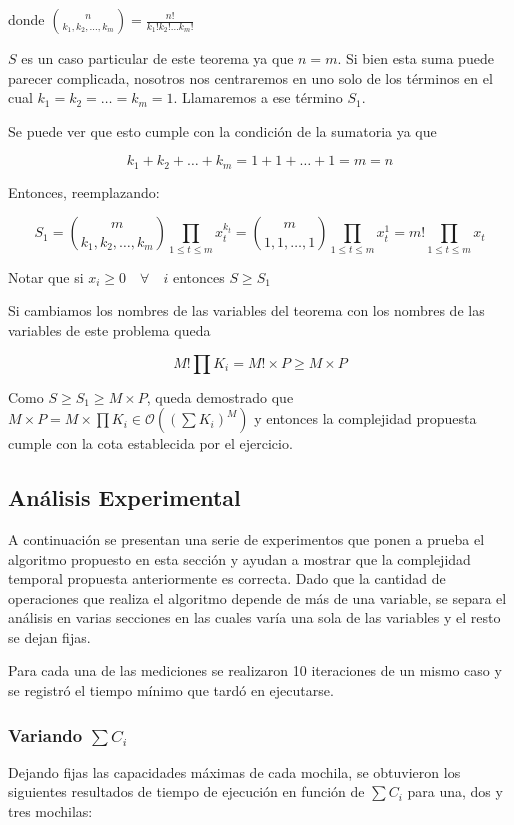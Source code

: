 donde $\binom{n}{k_1, k_2, \ldots , k_m} = \frac{n!}{k_1! k_2! \ldots k_m!}$

$S$ es un caso particular de este teorema ya que $n = m$. Si bien esta suma puede parecer complicada, nosotros nos centraremos en uno solo de los términos en el cual $k_1 = k_2 = \ldots = k_m = 1$. Llamaremos a ese término $S_1$.

Se puede ver que esto cumple con la condición de la sumatoria ya que

$$k_1 + k_2 + \ldots + k_m = 1 + 1 + \ldots + 1 = m = n$$

Entonces, reemplazando:

$$S_1 = \binom{m}{k_1, k_2, \ldots , k_m} \prod_{1 \leq t \leq m} x_t^{k_t} = \binom{m}{1, 1, \ldots , 1} \prod_{1 \leq t \leq m} x_t^{1} = m! \prod_{1 \leq t \leq m} x_t $$

Notar que si $x_i \geq 0 \quad \forall \quad i$ entonces $S \geq S_1$

Si cambiamos los nombres de las variables del teorema con los nombres de las variables de este problema queda

$$M! \prod K_i = M! \times P \geq M \times P$$

Como $S \geq S_1 \geq M \times P$, queda demostrado que $M \times P = M \times \prod K_i \in \mathcal{O}((\sum K_i)^M)$ y entonces la complejidad propuesta cumple con la cota establecida por el ejercicio.\QEDB

\subsection{Análisis Experimental}

A continuación se presentan una serie de experimentos que ponen a prueba el algoritmo propuesto en esta sección y ayudan a mostrar que la complejidad temporal propuesta anteriormente es correcta.
Dado que la cantidad de operaciones que realiza el algoritmo depende de más de una variable, se separa el análisis en varias secciones en las cuales varía una sola de las variables y el resto se dejan fijas.

Para cada una de las mediciones se realizaron 10 iteraciones de un mismo caso y se registró el tiempo mínimo que tardó en ejecutarse.

\subsubsection{Variando $\sum C_i$}

Dejando fijas las capacidades máximas de cada mochila, se obtuvieron los siguientes resultados de tiempo de ejecución en función de $\sum C_i$ para una, dos y tres mochilas:

